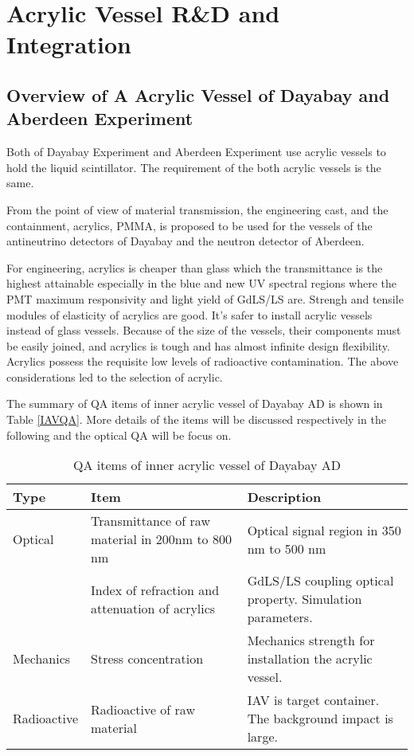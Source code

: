 \chapter {Acrylic Vessel R\&D and Integration}
\label{chap:arylicVessel}
\section {Overview of A Acrylic Vessel of Dayabay and Aberdeen Experiment}

Both of Dayabay Experiment and Aberdeen Experiment use acrylic vessels to hold
the liquid scintillator. The requirement of the both acrylic vessels is the same.

From the point of view of material transmission, the engineering cast, and the containment, 
acrylics, PMMA, is proposed to be used for the vessels of the antineutrino detectors of Dayabay and the neutron detector of Aberdeen.

For engineering, acrylics is cheaper than glass which the transmittance is the highest attainable
especially in the blue and new UV spectral regions where the PMT maximum responsivity and light yield of GdLS/LS are.
Strengh and tensile modules of elasticity of acrylics are good.
It's safer to install acrylic vessels instead of glass vessels.
Because of the size of the vessels, their components must be easily joined, and acrylics
is tough and has almost infinite design flexibility.
Acrylics possess the requisite low levels of radioactive contamination.
The above considerations led to the selection of acrylic.

The summary of QA items of inner acrylic vessel of Dayabay AD is shown in
Table \ref{IAVQA}. More details of the items will be discussed respectively in the following and
the optical QA will be focus on.
\begin{table}
\centering
\caption{QA items of inner acrylic vessel of Dayabay AD}
\label{tab:IAVQA}
\begin{tabular}{lp{5.0cm}p{5.0cm}}
\hline
Type & Item & Description \\
\hline
\hline
Optical & Transmittance of raw material in 200nm to 800 nm & Optical signal region in 350 nm to 500 nm \\
        & Index of refraction and attenuation of acrylics & GdLS/LS coupling optical property. Simulation parameters.\\
Mechanics & Stress concentration & Mechanics strength for installation the acrylic vessel. \\
Radioactive & Radioactive of raw material & IAV is target container. The background impact is large.\\
\hline
\end{tabular}
\end{table}




